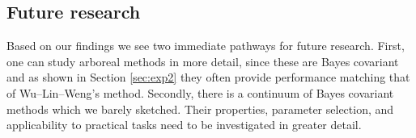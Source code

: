 \subsection{Future research}

Based on our findings we see two immediate pathways for future research. First, one can study arboreal methods in more detail, since these are Bayes covariant and as shown in Section \ref{sec:exp2} they often provide performance matching that of Wu--Lin--Weng's method. Secondly, there is a continuum of Bayes covariant methods which we barely sketched. Their properties, parameter selection,  and applicability to practical tasks need to be investigated in greater detail.



%
%
%
%
%
